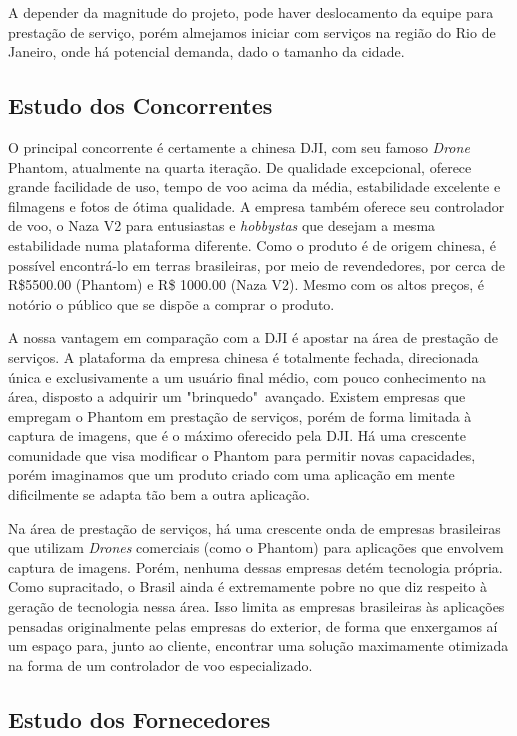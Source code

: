A depender da magnitude do projeto, pode haver deslocamento da equipe para prestação de serviço, porém almejamos iniciar com serviços na região do Rio de Janeiro,
onde há potencial demanda, dado o tamanho da cidade.

\subsection{Estudo dos Concorrentes}

O principal concorrente é certamente a chinesa DJI, com seu famoso \emph{Drone} Phantom, atualmente na quarta iteração. De qualidade excepcional, oferece
grande facilidade de uso, tempo de voo acima da média, estabilidade excelente e filmagens e fotos de ótima qualidade. A empresa também oferece seu controlador
de voo, o Naza V2 para entusiastas e \emph{hobbystas} que desejam a mesma estabilidade numa plataforma diferente. Como o produto é de origem chinesa, é
possível encontrá-lo em terras brasileiras, por meio de revendedores, por cerca de R\$5500.00 (Phantom) e R\$ 1000.00 (Naza V2). Mesmo com os altos preços,
é notório o público que se dispõe a comprar o produto.

A nossa vantagem em comparação com a DJI é apostar na área de prestação de serviços. A plataforma da empresa chinesa é totalmente fechada, direcionada única e
exclusivamente a um usuário final médio, com pouco conhecimento na área, disposto a adquirir um "brinquedo"\ avançado. Existem empresas que empregam o Phantom
em prestação de serviços, porém de forma limitada à captura de imagens, que é o máximo oferecido pela DJI. Há uma crescente comunidade que visa modificar o Phantom
para permitir novas capacidades, porém imaginamos que um produto criado com uma aplicação em mente dificilmente se adapta tão bem a outra aplicação.

Na área de prestação de serviços, há uma crescente onda de empresas brasileiras que utilizam \emph{Drones} comerciais (como o Phantom) para aplicações que envolvem
captura de imagens. Porém, nenhuma dessas empresas detém tecnologia própria. Como supracitado, o Brasil ainda é extremamente pobre no que diz respeito à geração de
tecnologia nessa área. Isso limita as empresas brasileiras às aplicações pensadas originalmente pelas empresas do exterior, de forma que enxergamos aí um espaço para,
junto ao cliente, encontrar uma solução maximamente otimizada na forma de um controlador de voo especializado.

\subsection{Estudo dos Fornecedores}

